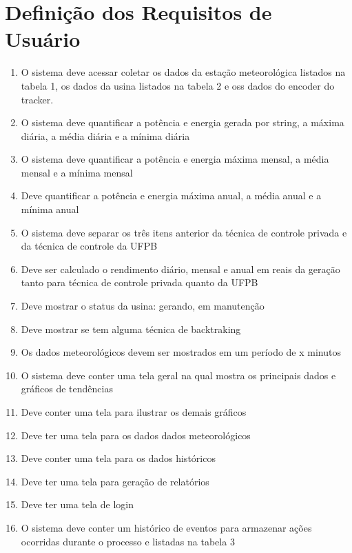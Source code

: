 \documentclass[a4paper,12pt]{article}
\begin{document}

\section{Definição dos Requisitos de Usuário}
\begin{enumerate}
    \item O sistema deve acessar coletar os dados da estação meteorológica listados na tabela 1, os dados da usina listados na tabela 2 e oss dados do encoder do tracker. 
    \item O sistema deve quantificar a potência e energia gerada por string, a máxima diária, a média diária e a mínima diária
    \item O sistema deve quantificar a potência e energia máxima mensal, a média mensal e a mínima mensal
    \item Deve quantificar a potência e energia máxima anual, a média anual e a mínima anual
    \item O sistema deve separar os três itens anterior da técnica de controle privada e da técnica de  controle da UFPB
    \item Deve ser calculado o rendimento diário, mensal e anual em reais da geração tanto para técnica de controle privada quanto da UFPB
    \item Deve mostrar o status da usina: gerando, em manutenção
    \item Deve mostrar se tem alguma técnica de backtraking
    \item Os dados meteorológicos devem ser mostrados em um período de x minutos
    \item O sistema deve conter uma tela geral na qual mostra os principais dados e gráficos de tendências
    \item Deve conter uma tela para ilustrar os demais gráficos
    \item Deve ter uma tela para os dados dados meteorológicos
    \item Deve conter uma tela para os dados históricos 
    \item Deve ter uma tela para geração de relatórios
    \item Deve ter uma tela de login

    \item O sistema deve conter um histórico de eventos  para armazenar ações ocorridas durante o processo e listadas na tabela 3
    

\end{enumerate}
\end{document}

